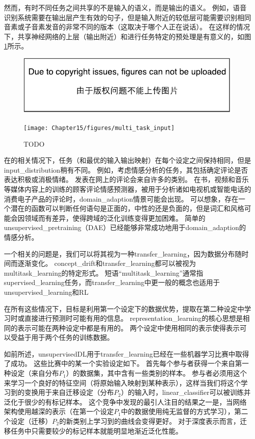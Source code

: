 然而，有时不同任务之间共享的不是输入的语义，而是输出的语义。
例如，语音识别系统需要在输出层产生有效的句子，但是输入附近的较低层可能需要识别相同音素或子音素发音的非常不同的版本（这取决于哪个人正在说话）。
在这样的情况下，共享神经网络的上层（输出附近）和进行任务特定的预处理是有意义的，如图\ref{fig:chap15_multi_task_input}所示。

\begin{figure}[!htb]
\ifOpenSource
\centerline{\includegraphics{figure.pdf}}
\else
\centerline{\texttt{[image: Chapter15/figures/multi\_task\_input]}}
\fi
\caption{TODO}
\label{fig:chap15_multi_task_input}
\end{figure}

在的相关情况下，任务（和最优的输入输出映射）在每个设定之间保持相同，但是\gls{input_distribution}稍有不同。 
例如，考虑情感分析的任务，其包括确定评论是否表达积极或消极情绪。 
发表在网上的评论会来自许多的类别。
在书，视频和音乐等媒体内容上的训练的顾客评论情感预测器，被用于分析诸如电视机或智能电话的消费电子产品的评论时，\gls{domain_adaption}情景可能会出现。
可以想象，存在一个潜在的函数可以判断任何语句是正面的，中性的还是负面的，但是词汇和风格可能会因领域而有差异，使得跨域的泛化训练变得更加困难。
简单的\gls{unsupervised_pretraining}（\gls{DAE}）已经能够非常成功地用于\gls{domain_adaption}的情感分析\citep{Glorot+al-ICML-2011}。


一个相关的问题是，我们可以将其视为一种\gls{transfer_learning}，因为数据分布随时间而逐渐变化。
\gls{concept_drift}和\gls{transfer_learning}都可以被视为\gls{multitask_learning}的特定形式。
短语``\gls{multitask_learning}''通常指\gls{supervised_learning}任务，而\gls{transfer_learning}中更一般的概念也适用于\gls{unsupervised_learning}和\gls{RL}

在所有这些情况下，目标是利用第一个设定下的数据优势，提取在第二种设定中学习时或直接进行预测时可能有用的信息。
\gls{representation_learning}的核心思想是相同的表示可能在两种设定中都是有用的。
两个设定中使用相同的表示使得表示可以受益于用于两个任务的训练数据。


如前所述，\gls{unsupervised}\gls{DL}用于\gls{transfer_learning}已经在一些机器学习比赛中取得了成功\citep{UTLC+LISA-2011-small,goodfellow+all-NIPS2011}。
这些比赛中的某一个实验设定如下。
首先每个参与者获得一个来自第一种设定（来自分布$P_1$）的数据集，其中含有一些类别的样本。
参与者必须用这个来学习一个良好的特征空间（将原始输入映射到某种表示），这样当我们将这个学习到的变换用于来自迁移设定（分布$P_2$）的输入时，\gls{linear_classifier}可以被训练并泛化于很少的有标记样本。
这个竞争中发现的最引人注目的结果之一是，当网络架构使用越深的表示（在第一个设定$P_1$中的数据使用纯无监督的方式学习），第二个设定（迁移）$P_2$的新类别上学习到的曲线会变得更好。
对于深度表示而言，迁移任务中只需要较少的标记样本就能明显地渐近泛化性能。

